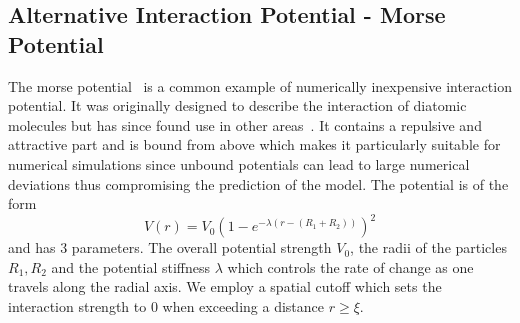 \documentclass[10pt,letterpaper]{article}
\begin{document}
\subsection{Alternative Interaction Potential - Morse Potential}
The morse potential~\cite{Morse1929} is a common example of numerically inexpensive interaction
potential.
It was originally designed to describe the interaction of diatomic molecules but has since found use
in other areas~\cite{Breitwieser2021}.
It contains a repulsive and attractive part and is bound from above which makes it particularly
suitable for numerical simulations since unbound potentials can lead to large numerical deviations
thus compromising the prediction of the model.
The potential is of the form
\begin{equation}
    V(r) = V_0\left(1-e^{-\lambda(r-(R_1+R_2))}\right)^2
\end{equation}
and has 3 parameters.
The overall potential strength $V_0$, the radii of the particles $R_1,R_2$ and the potential
stiffness $\lambda$ which controls the rate of change as one travels along the radial axis.
We employ a spatial cutoff which sets the interaction strength to $0$ when exceeding a distance
$r\geq\xi$.


\end{document}

